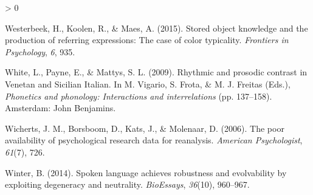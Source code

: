 \documentclass[
  english,
  man,floatsintext]{apa6}
\newlength{\cslhangindent}
\newenvironment{CSLReferences}[2] %
 {%
  \setlength{\parindent}{0pt}
  \ifodd #1 \everypar{\setlength{\hangindent}{\cslhangindent}}\ignorespaces\fi
  \ifnum #2 > 0
  \setlength{\parskip}{#2\baselineskip}
  \fi
 }%
 {}
\begin{document}
\begin{CSLReferences}{1}{0}
\leavevmode\hypertarget{ref-westerbeek2015stored}{}%
Westerbeek, H., Koolen, R., \& Maes, A. (2015). Stored object knowledge and the production of referring expressions: The case of color typicality. \emph{Frontiers in Psychology}, \emph{6}, 935.

\leavevmode\hypertarget{ref-white2009}{}%
White, L., Payne, E., \& Mattys, S. L. (2009). Rhythmic and prosodic contrast in {V}enetan and {S}icilian {I}talian. In M. Vigario, S. Frota, \& M. J. Freitas (Eds.), \emph{Phonetics and phonology: Interactions and interrelations} (pp. 137--158). Amsterdam: John Benjamins.

\leavevmode\hypertarget{ref-wicherts2006poor}{}%
Wicherts, J. M., Borsboom, D., Kats, J., \& Molenaar, D. (2006). The poor availability of psychological research data for reanalysis. \emph{American Psychologist}, \emph{61}(7), 726.

\leavevmode\hypertarget{ref-winter2014spoken}{}%
Winter, B. (2014). Spoken language achieves robustness and evolvability by exploiting degeneracy and neutrality. \emph{BioEssays}, \emph{36}(10), 960--967.

\end{CSLReferences}

\endgroup
\end{document}
